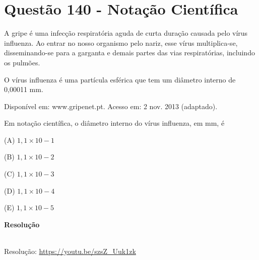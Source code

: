 \section{Questão 140 - Notação Científica}

A gripe é uma infecção respiratória aguda de curta duração causada pelo vírus influenza. Ao entrar no nosso organismo pelo nariz, esse vírus multiplica-se, disseminando-se para a garganta e demais partes das vias respiratórias, incluindo os pulmões. 

O vírus influenza é uma partícula esférica que tem um diâmetro interno de 0,00011 mm.

\begin{flushright}
    {\scriptsize Disponível em: www.gripenet.pt. Acesso em: 2 nov. 2013 (adaptado).}
\end{flushright}

Em notação científica, o diâmetro interno do vírus influenza, em mm, é

(A)  $ 1,1 × 10-1 $

(B)  $ 1,1 × 10-2 $

(C)  $ 1,1 × 10-3 $

(D)  $ 1,1 × 10-4 $

(E)  $ 1,1 × 10-5 $

\textbf{Resolução}












\begin{center}
    \href{https://youtu.be/S22SHYt4n-o}{
    }\\
    Resolução: \url{https://youtu.be/szsZ_Uuk1zk}
\end{center}
